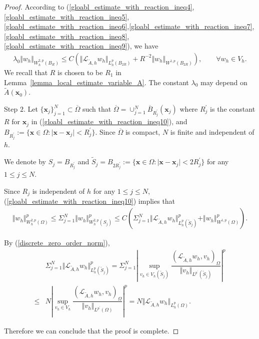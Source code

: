 \documentclass[12pt]{amsart}
\newcommand{\boldx}{\boldsymbol{x}}
\theoremstyle{definition}
\theoremstyle{remark}
\begin{document}
\begin{proof}
According to (\ref{gloabl_estimate_with_reaction_ineq4},\ref{gloabl_estimate_with_reaction_ineq5},
\ref{gloabl_estimate_with_reaction_ineq6},\ref{gloabl_estimate_with_reaction_ineq7},\ref{gloabl_estimate_with_reaction_ineq8},
\ref{gloabl_estimate_with_reaction_ineq9}), we have 
\begin{align}
\label{gloabl_estimate_with_reaction_ineq10} 
\lambda_{0}\Vert w_{h}\Vert_{W_{h}^{2,p}(B_{R})} 
\leq C \left( \Vert \mathcal{L}_{\tilde{A},h}w_{h}\Vert_{L_{h}^{p}(B_{2R})} 
+ R^{-2} \Vert w_{h} \Vert_{W^{1,p}(B_{2R})} \right), \qquad \forall w_{h} \in V_{h}.
\end{align}
We recall that $R$ is chosen to be $R_{1}$ in Lemma~\ref{lemma_local_estimate_variable_A}. 
The constant $\lambda_{0}$ may depend on $\tilde{A}(\boldx_{0})$.  
 
Step $2$. Let $\{\boldx_{j}\}_{j=1}^{N} \subset \overline{\Omega}$ such that 
$\overline{\Omega} = \cup_{j=1}^{N}\overline{B}_{R_{j}^{\prime}}(\boldx_{j})$ 
where $R_{j}^{\prime}$ is the constant $R$ for $\boldx_{j}$ in (\ref{gloabl_estimate_with_reaction_ineq10}), 
and $B_{R_{j}^{\prime}}:= \{ \boldx \in \Omega : \vert \boldx - \boldx_{j} \vert 
< R_{j}^{\prime}\}$. Since $\overline{\Omega}$ is compact, $N$ is finite and independent of $h$.

We denote by $S_{j} = B_{R_{j}^{\prime}}$ and $\tilde{S}_{j} = B_{2R_{j}^{\prime}}
:= \{ \boldx \in \Omega : \vert \boldx - \boldx_{j} \vert < 2R_{j}^{\prime}\}$ for any $1\leq j \leq N$.

Since $R_{j}$ is independent of $h$ for any $1 \leq j \leq N$, (\ref{gloabl_estimate_with_reaction_ineq10}) 
implies that 
\begin{align*}
\Vert w_{h}\Vert_{W_{h}^{2,p}(\Omega)}^{p}  \leq \Sigma_{j=1}^{N} \Vert w_{h} \Vert_{W_{h}^{2,p}(S_{j})}^{p} 
\leq C \left( \Sigma_{j=1}^{N} \Vert \mathcal{L}_{\tilde{A},h} w_{h} \Vert_{L_{h}^{p}(\tilde{S}_{j})}^{p} 
+ \Vert w_{h}\Vert_{W^{1,p}(\Omega)}^{p} \right).
\end{align*} 

By (\ref{discrete_zero_order_norm}), 
\begin{align*}
& \Sigma_{j=1}^{N} \Vert \mathcal{L}_{\tilde{A},h} w_{h} \Vert_{L_{h}^{p}(\tilde{S}_{j})}^{p}
= \Sigma_{j=1}^{N} \left| \sup_{v_{h} \in V_{h}(\tilde{S}_{j})}\dfrac{(\mathcal{L}_{\tilde{A},h} 
w_{h}, v_{h})_{\Omega}}{\Vert v_{h}\Vert_{L^{p^{\prime}}(\tilde{S}_{j})}} \right|^{p}\\
\leq & N \left| \sup_{v_{h} \in V_{h}}\dfrac{(\mathcal{L}_{\tilde{A},h} 
w_{h}, v_{h})_{\Omega}}{\Vert v_{h}\Vert_{L^{p^{\prime}}(\Omega)}} \right|^{p} 
= N \Vert \mathcal{L}_{\tilde{A}, h}w_{h} \Vert_{L_{h}^{p}(\Omega)}.
\end{align*}
 
Therefore we can conclude that the proof is complete.
\end{proof}
\end{document}

